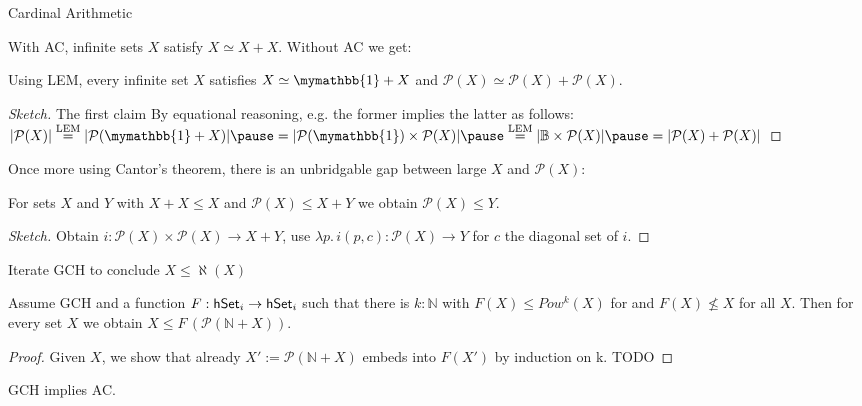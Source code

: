 \documentclass[xcolor=dvipsnames,compress,aspectratio=169,handout]{beamer}
\newcommand{\MBB}[1]{\ensuremath{\mathbb{#1}}\xspace}  %
\newcommand{\MCL}[1]{\ensuremath{\mathcal{#1}}\xspace} %
\newcommand{\Nat}{\MBB{N}}   %
\newcommand{\Bool}{\MBB{B}}  %
\newcommand{\Unit}{\mymathbb{1}}  %
\newcommand{\Pow}{\MCL P}
\begin{document}
\begin{frame}{Cardinal Arithmetic}

With AC, infinite sets $X$ satisfy $X\simeq X+X$. Without AC we get:

\begin{lemma}
	Using LEM, every infinite set $X$ satisfies $X\simeq\Unit+X$ and $\Pow(X)\simeq\Pow(X)+\Pow(X)$.
\end{lemma}
\vspace{-0.1cm}
\begin{proof}[Sketch]
	The first claim 
	By equational reasoning, e.g. the former implies the latter as follows:
	$|\Pow(X)|\overset{\textnormal{LEM}}=|\Pow(\Unit+X)|\pause=|\Pow(\Unit)\times \Pow (X)|\pause\overset{\textnormal{LEM}}=|\Bool\times \Pow(X)|\pause= |\Pow(X)+\Pow(X)|$
\end{proof}

\vspace{0.3cm}
Once more using Cantor's theorem, there is an unbridgable gap between large $X$ and $\Pow(X)$:
\begin{lemma}[Sketch]
	For sets $X$ and $Y$ with $X+X\le X$ and $\Pow (X)\le X+Y$ we obtain $\Pow (X)\le Y$.
\end{lemma}
\vspace{-0.1cm}
\begin{proof}[Sketch]
	Obtain $i:\Pow (X)\times\Pow (X)\to X+Y$, use $\lambda p.\, i(p,c):\Pow (X)\to Y$ for $c$ the diagonal set of $i$.
\end{proof}

\end{frame}

\begin{frame}{Iterate GCH to conclude $X\le \aleph(X)$}

	\begin{theorem}
		Assume GCH and a function $F:\mathsf{hSet}_i\to\mathsf{hSet}_i$ such that there is $k:\Nat$ with $F(X)\le Pow^k(X)$ for and $F(X)\not\le X$ for all $X$.
		Then for every set $X$ we obtain $X\le F\,(\Pow(\Nat + X))$.
	\end{theorem}

	\begin{proof}
		Given $X$, we show that already $X':=\Pow(\Nat + X)$ embeds into $F(X')$ by induction on k.
		TODO
	\end{proof}
	\begin{corollary}
		GCH implies AC.
	\end{corollary}
\end{frame}
\end{document}
